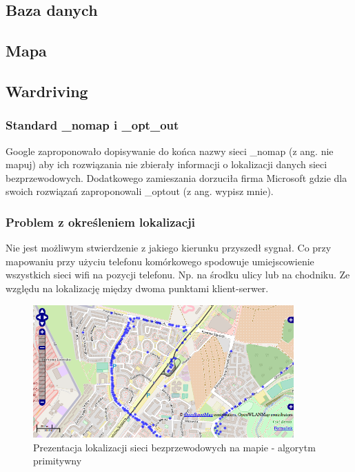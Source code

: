 \subsection{Baza danych}
\subsection{Mapa}

\subsection{Wardriving}
\subsubsection{Standard \_nomap i \_opt\_out}
Google zaproponowało dopisywanie do końca nazwy sieci \_nomap (z ang. nie mapuj) aby ich rozwiązania nie zbierały informacji o lokalizacji danych sieci bezprzewodowych.\cite{GoogleNomap} Dodatkowego zamieszania dorzuciła firma Microsoft gdzie dla swoich rozwiązań zaproponowali \_optout (z ang. wypisz mnie).\cite{MicrosoftOptout}

\subsubsection{Problem z określeniem lokalizacji}
Nie jest możliwym stwierdzenie z jakiego kierunku przyszedł sygnał. Co przy mapowaniu przy użyciu telefonu komórkowego spodowuje umiejscowienie wszystkich sieci wifi na pozycji telefonu. Np. na środku ulicy lub na chodniku.
Ze względu na lokalizację między dwoma punktami klient-serwer.

\begin{figure}[h!]
  \centering
    \includegraphics[width=10cm]{images/poor-scan-result}
  \caption{Prezentacja lokalizacji sieci bezprzewodowych na mapie - algorytm primitywny}
  \label{fig:warsaw10kmRadius}
\end{figure}

